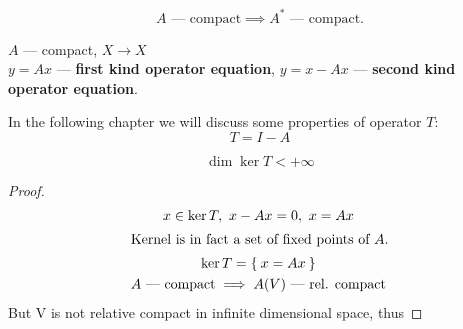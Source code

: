 \begin{stm}
   \[
     A \text{ --- compact} \implies A^* \text{ --- compact}.
   \]
 \end{stm}
 
 \begin{defn}
   $A$ --- compact, $X \to X$ \\
   $y = Ax$ --- \textbf{first kind operator equation},
   $y = x - Ax$ --- \textbf{second kind operator equation}.
 \end{defn}
\noindent
In the following chapter we will discuss some properties of operator $T$:
\[
  T = I - A
\]
 
 \begin{thm}
   \[
     \dim{\ker{T}} < +\infty
   \]
 \end{thm}
 
 \begin{proof}
   \begin{gather*}
     x \in \ker{T},\ x - Ax = 0,\ x = Ax \\
     \shortintertext{Kernel is in fact a set of fixed points of $A$.}
     \ker{T} = \Set{x = Ax} \\
     A \text{ --- compact} \implies A(V) \text{ --- rel. compact}
   \end{gather*}
   But V is not relative compact in infinite dimensional space, thus 
 \end{proof}